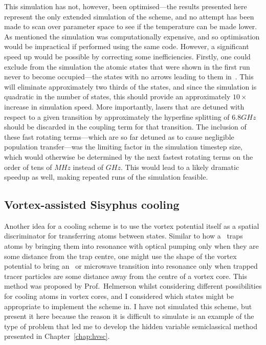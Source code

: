 This simulation has not, however, been optimised---the results presented here represent the only extended simulation of the scheme, and no attempt has been made to scan over parameter space to see if the temperature can be made lower. As mentioned the simulation was computationally expensive, and so optimisation would be impractical if performed using the same code. However, a significant speed up would be possible by correcting some inefficiencies. Firstly, one could exclude from the simulation the atomic states that were shown in the first run never to become occupied---the states with no arrows leading to them in~. This will eliminate approximately two thirds of the states, and since the simulation is quadratic in the number of states, this should provide an approximately $10\times$ increase in simulation speed. More importantly, lasers that are detuned with respect to a given transition by approximately the hyperfine splitting of $6.8\unit{GHz}$ should be discarded in the coupling term for that transition. The inclusion of these fast rotating terms---which are so far detuned as to cause negligible population transfer---was the limiting factor in the simulation timestep size, which would otherwise be determined by the next fastest rotating terms on the order of tens of $\unit{MHz}$ instead of $\unit{GHz}$. This would lead to a likely dramatic speedup as well, making repeated runs of the simulation feasible.

\subsection{Vortex-assisted Sisyphus cooling}\label{sec:vortexcooling}

Another idea for a cooling scheme is to use the vortex potential itself as a spatial discriminator for transferring atoms between states. Similar to how a \mot\ traps atoms by bringing them into resonance with optical pumping only when they are some distance from the trap centre, one might use the shape of the vortex potential to bring an \rf\ or microwave transition into resonance only when trapped tracer particles are some distance away from the centre of a vortex core. This method was proposed by Prof.~Helmerson whilst considering different possibilities for cooling atoms in vortex cores, and I considered which states might be appropriate to implement the scheme in. I have not simulated this scheme, but present it here because the reason it is difficult to simulate is an example of the type of problem that led me to develop the hidden variable semiclassical method presented in Chapter~\ref{chap:hvsc}.

